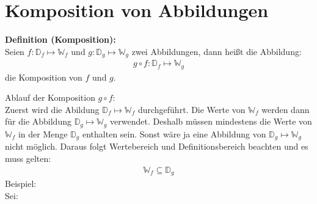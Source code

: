






\section{Komposition von Abbildungen}

\textbf{Definition (Komposition):}\\
Seien $f:\mathbb{D}_f\longmapsto\mathbb{W}_f$ und $g:\mathbb{D}_g\longmapsto\mathbb{W}_g$ zwei Abbildungen, dann heißt die Abbildung:\\
\begin{align*}
	g\circ f: \mathbb{D}_f\longmapsto\mathbb{W}_g
\end{align*}
die Komposition von $f$ und $g$.\\
\begin{center}
	
\end{center}
Ablauf der Komposition $g\circ f$:\\
Zuerst wird die Abildung $\mathbb{D}_f\longmapsto\mathbb{W}_f$ durchgeführt. Die Werte von $\mathbb{W}_f$ werden dann für die Abbildung $\mathbb{D}_g\longmapsto\mathbb{W}_g$ verwendet. Deshalb müssen mindestens die Werte von $\mathbb{W}_f$ in der Menge $\mathbb{D}_g$ enthalten sein. Sonst wäre ja eine Abbildung von $\mathbb{D}_g\longmapsto \mathbb{W}_g$ nicht möglich. Daraus folgt Wertebereich und Definitionsbereich beachten und es muss gelten:\\
\begin{align*}
	\mathbb{W}_f\subseteq \mathbb{D}_g
\end{align*}
Beispiel:\\
Sei:

